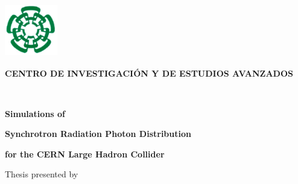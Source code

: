 \documentclass[12pt,letterpaper,spanish,openrigth,twoside]{book}%
\newcommand{\bs}{\bigskip}
\begin{document}
\renewcommand{\thepage}{\roman{page}}
\hspace{-2.9cm}
\begin{minipage}{2.3cm}\vspace{-6.0 cm}
\includegraphics [width=2.3cm,height=2.3cm]{logo.pdf}
\end{minipage}
\begin{center}
\vspace{-4.6cm} \begin{large}
{\bf \hspace{-1.2cm}\textsf{CENTRO DE INVESTIGACIÓN Y DE ESTUDIOS AVANZADOS}}\\   \end{large}
\\ 
\end{center}

\bs\bs\bs\bs
\begin{center}
 {\large \bf \bs \bf \hspace{-2.8cm}\textsf{Simulations of} }
\end{center}
\begin{center}
 {\large \bf \bs \bf \hspace{-2.8cm}\textsf{Synchrotron Radiation Photon Distribution} }
\end{center}
\begin{center} {\large \bf \bs \bf \hspace{-2.8cm}\textsf{for the CERN Large Hadron Collider}}
\end{center}\bs\bs\bs 
 \begin{center}
{\large \hspace{-2.8cm}\textsf{Thesis presented by}}
\end{center}\bs
\end{document}

